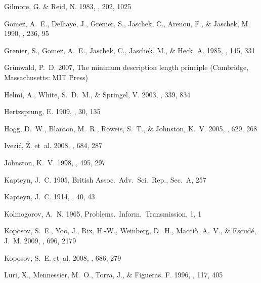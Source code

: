 \begin{thebibliography}{99}
{Gilmore}, G. \& {Reid}, N. 1983, \mnras, 202, 1025

{Gomez}, A.~E., {Delhaye}, J., {Grenier}, S., {Jaschek}, C., {Arenou}, F., \&
  {Jaschek}, M. 1990, \aap, 236, 95

{Grenier}, S., {Gomez}, A.~E., {Jaschek}, C., {Jaschek}, M., \& {Heck}, A.
  1985, \aap, 145, 331

{Gr{\"u}nwald}, P.~D. 2007, {The minimum description length principle}
  (Cambridge, Massachusetts: {MIT Press})

{Helmi}, A., {White}, S.~D.~M., \& {Springel}, V. 2003, \mnras, 339, 834

{Hertzsprung}, E. 1909, \apj, 30, 135

{Hogg}, D.~W., {Blanton}, M.~R., {Roweis}, S.~T., \& {Johnston}, K.~V. 2005,
  \apj, 629, 268

{Ivezi{\'c}}, {\v Z}. {et~al.} 2008, \apj, 684, 287

{Johnston}, K.~V. 1998, \apj, 495, 297

{Kapteyn}, J.~C. 1905, {British Assoc.~Adv.~Sci.~Rep.}, Sec.~A, 257

{Kapteyn}, J.~C. 1914, \apj, 40, 43

{Kolmogorov}, A.~N. 1965, {Problems.~Inform.~Transmission}, 1, 1

{Koposov}, S.~E., {Yoo}, J., {Rix}, H.-W., {Weinberg}, D.~H., {Macci{\`o}},
  A.~V., \& {Escud{\'e}}, J.~M. 2009, \apj, 696, 2179

{Koposov}, S.~E. {et~al.} 2008, \apj, 686, 279

{Luri}, X., {Mennessier}, M.~O., {Torra}, J., \& {Figueras}, F. 1996, \aaps,
  117, 405


\end{thebibliography}
